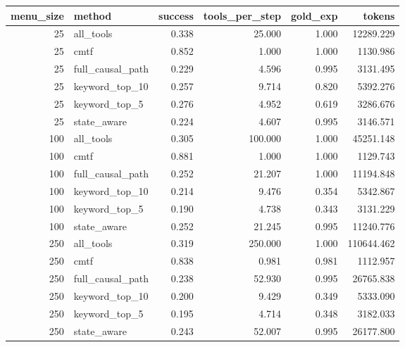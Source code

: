 \begin{tabular}{rlrrrr}
\toprule
menu_size & method & success & tools_per_step & gold_exp & tokens \\
\midrule
25 & all_tools & 0.338 & 25.000 & 1.000 & 12289.229 \\
25 & cmtf & 0.852 & 1.000 & 1.000 & 1130.986 \\
25 & full_causal_path & 0.229 & 4.596 & 0.995 & 3131.495 \\
25 & keyword_top_10 & 0.257 & 9.714 & 0.820 & 5392.276 \\
25 & keyword_top_5 & 0.276 & 4.952 & 0.619 & 3286.676 \\
25 & state_aware & 0.224 & 4.607 & 0.995 & 3146.571 \\
100 & all_tools & 0.305 & 100.000 & 1.000 & 45251.148 \\
100 & cmtf & 0.881 & 1.000 & 1.000 & 1129.743 \\
100 & full_causal_path & 0.252 & 21.207 & 1.000 & 11194.848 \\
100 & keyword_top_10 & 0.214 & 9.476 & 0.354 & 5342.867 \\
100 & keyword_top_5 & 0.190 & 4.738 & 0.343 & 3131.229 \\
100 & state_aware & 0.252 & 21.245 & 0.995 & 11240.776 \\
250 & all_tools & 0.319 & 250.000 & 1.000 & 110644.462 \\
250 & cmtf & 0.838 & 0.981 & 0.981 & 1112.957 \\
250 & full_causal_path & 0.238 & 52.930 & 0.995 & 26765.838 \\
250 & keyword_top_10 & 0.200 & 9.429 & 0.349 & 5333.090 \\
250 & keyword_top_5 & 0.195 & 4.714 & 0.348 & 3182.033 \\
250 & state_aware & 0.243 & 52.007 & 0.995 & 26177.800 \\
\bottomrule
\end{tabular}
